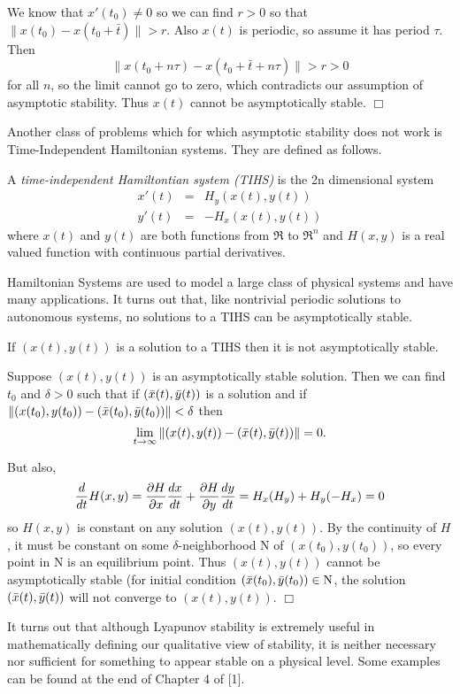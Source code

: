 \documentclass[nols]{tufte-handout}
\theoremstyle{definition}
\begin{document}
We know that $x'(t_0) \neq 0$ so we can find $r > 0$ so that $\|x(t_0)
- x(t_0 + \bar{t}) \| > r$.  Also $x(t)$ is periodic, so assume it has
period $\tau$.  Then
$$\| x(t_0 + n \tau) - x(t_0 + \bar{t} + n \tau) \| > r >0$$
for all $n$, so the limit cannot go to zero, which contradicts our
assumption of asymptotic stability.  Thus $x(t)$ cannot be
asymptotically stable. $\Box$ 

Another class of problems which for which asymptotic stability does
not work is Time-Independent Hamiltonian systems.  They are defined as follows.

\begin{dfn}
	A {\em time-independent Hamiltontian system (TIHS)} is the 2n
dimensional system
\begin{eqnarray*}
	x'(t) & = & H_y(x(t), y(t)) \\
	y'(t) & = & -H_x(x(t), y(t))
\end{eqnarray*}
where $x(t)$ and $y(t)$ are both functions from $\Re$ to $\Re^n$ and
$H(x,y)$ is a real valued function with continuous partial
derivatives.
\end{dfn}

Hamiltonian Systems are used to model a large class of physical systems
and have many applications.  It turns out that, like nontrivial
periodic solutions to autonomous systems, no solutions to a TIHS can be
asymptotically stable.

\begin{thm}
	If $(x(t), y(t))$ is a solution to a TIHS then it is not
asymptotically stable.
\end{thm}

\pf Suppose $(x(t),y(t))$ is an asymptotically stable solution.  Then
we can find $t_0$ and $\delta > 0$ such that if $(\bar{x}(t), \bar{y}(t))$ is
a solution and if $\| (x(t_0),y(t_0)) - (\bar{x}(t_0), \bar{y}(t_0)) \| < \delta$ then
$$\lim_{t \rightarrow \infty} \| (x(t),y(t)) - (\bar{x}(t), \bar{y}(t)) \| =
0.$$

But also, 
$${d \over dt} H(x,y) = {\partial H \over \partial x}{dx \over dt} +
{\partial H \over \partial y}{dy \over dt} = H_x (H_y) + H_y (-H_x) =
0$$
so $H(x,y)$ is constant on any solution $(x(t),y(t))$.  By the continuity of $H$,
it must be constant on some $\delta$-neighborhood N of
$(x(t_0),y(t_0))$, so every point in N is an equilibrium point.  Thus
$(x(t),y(t))$ cannot be asymptotically stable (for initial condition
$(\bar{x}(t_0),\bar{y}(t_0)) \in {\rm N}$, the solution
$(\bar{x}(t),\bar{y}(t))$ will not converge to $(x(t),y(t))$. $\Box$

It turns out that although Lyapunov stability is extremely useful in
mathematically defining our qualitative view of stability, it is
neither necessary nor sufficient for something to appear stable on a
physical level.  Some examples can be found at the end of Chapter 4 of [1].


\ifx \fillibre \undefined
\end{document}
